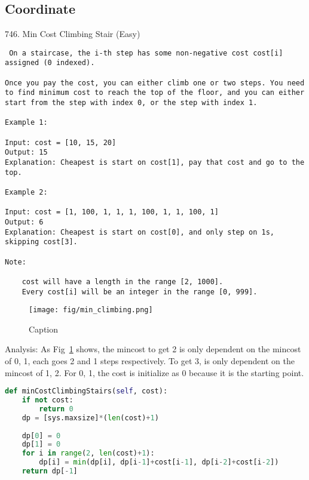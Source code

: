 \documentclass[../main.tex]{subfiles}
\begin{document}
\subsection{Coordinate}
746. Min Cost Climbing Stair (Easy)
\begin{lstlisting}
 On a staircase, the i-th step has some non-negative cost cost[i] assigned (0 indexed).

Once you pay the cost, you can either climb one or two steps. You need to find minimum cost to reach the top of the floor, and you can either start from the step with index 0, or the step with index 1.

Example 1:

Input: cost = [10, 15, 20]
Output: 15
Explanation: Cheapest is start on cost[1], pay that cost and go to the top.

Example 2:

Input: cost = [1, 100, 1, 1, 1, 100, 1, 1, 100, 1]
Output: 6
Explanation: Cheapest is start on cost[0], and only step on 1s, skipping cost[3].

Note:

    cost will have a length in the range [2, 1000].
    Every cost[i] will be an integer in the range [0, 999].
\end{lstlisting}
\begin{figure}[h]
    \centering
    \texttt{[image: fig/min\_climbing.png]}
    \caption{Caption}
    \label{fig:min_climbing}
\end{figure}
Analysis: As Fig~\ref{fig:min_climbing} shows, the mincost to get 2 is only dependent on the mincost of 0, 1, each goes 2 and 1 steps respectively. To get 3, is only dependent on the mincost of 1, 2. For 0, 1, the cost is initialize as 0 because it is the starting point.
\begin{lstlisting}[language=Python]
def minCostClimbingStairs(self, cost):
    if not cost:
        return 0
    dp = [sys.maxsize]*(len(cost)+1)
    
    dp[0] = 0
    dp[1] = 0
    for i in range(2, len(cost)+1):
        dp[i] = min(dp[i], dp[i-1]+cost[i-1], dp[i-2]+cost[i-2])
    return dp[-1]
\end{lstlisting}
\end{document}
